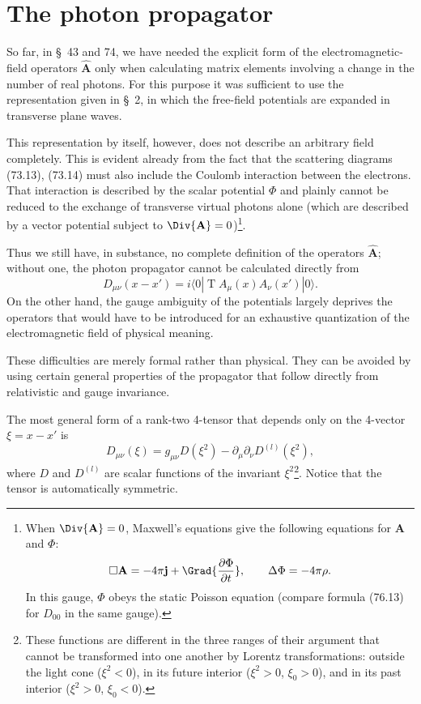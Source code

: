 \section{The photon propagator}

So far, in \S~43 and 74, we have needed the explicit form of the electromagnetic-field operators $\widehat{\mathbf A}$ only when calculating matrix elements involving a change in the number of real photons. For this purpose it was sufficient to use the representation given in \S~2, in which the free-field potentials are expanded in transverse plane waves.

This representation by itself, however, does not describe an arbitrary field completely. This is evident already from the fact that the scattering diagrams (73.13), (73.14) must also include the Coulomb interaction between the electrons. That interaction is described by the scalar potential $\Phi$ and plainly cannot be reduced to the exchange of transverse virtual photons alone (which are described by a vector potential subject to $\Div{\mathbf A}=0$)\footnote{When $\Div{\mathbf A}=0$, Maxwell's equations give the following equations for $\mathbf A$ and $\Phi$:
\[
\Box\mathbf A=-4\pi\mathbf j+\Grad{\frac{\partial\Phi}{\partial t}},\qquad \Delta\Phi=-4\pi\rho.
\]
In this gauge, $\Phi$ obeys the static Poisson equation (compare formula (76.13) for $D_{00}$ in the same gauge).}.

Thus we still have, in substance, no complete definition of the operators $\widehat{\mathbf A}$; without one, the photon propagator cannot be calculated directly from
\begin{equation}
D_{\mu\nu}(x-x')=i\langle 0|\operatorname{T}A_\mu(x)A_\nu(x')|0\rangle.
\tag{76.1}
\label{eq:76.1}
\end{equation}
On the other hand, the gauge ambiguity of the potentials largely deprives the operators that would have to be introduced for an exhaustive quantization of the electromagnetic field of physical meaning.

These difficulties are merely formal rather than physical. They can be avoided by using certain general properties of the propagator that follow directly from relativistic and gauge invariance.

The most general form of a rank-two 4-tensor that depends only on the 4-vector $\xi=x-x'$ is
\begin{equation}
D_{\mu\nu}(\xi)=g_{\mu\nu}D(\xi^2)-\partial_\mu\partial_\nu D^{(l)}(\xi^2),
\tag{76.2}
\end{equation}
where $D$ and $D^{(l)}$ are scalar functions of the invariant $\xi^2$\footnote{These functions are different in the three ranges of their argument that cannot be transformed into one another by Lorentz transformations: outside the light cone ($\xi^2<0$), in its future interior ($\xi^2>0$, $\xi_0>0$), and in its past interior ($\xi^2>0$, $\xi_0<0$).}. Notice that the tensor is automatically symmetric.

